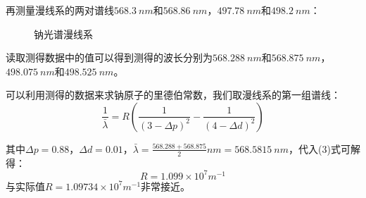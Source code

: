 \documentclass[utf8]{ctexart}
\begin{document}
	再测量漫线系的两对谱线$\qty{568.3}{nm}$和$\qty{568.86}{nm}$，$\qty{497.78}{nm}$和$\qty{498.2}{nm}$：
	\begin{figure}[htbp]
		\centering
		\hspace{0.1in} %
	\caption{钠光谱漫线系}
	\end{figure}

	读取测得数据中的值可以得到测得的波长分别为$\qty{568.288}{nm}$和$\qty{568.875}{nm}$，$\qty{498.075}{nm}$和$\qty{498.525}{nm}$。
	
	可以利用测得的数据来求钠原子的里德伯常数，我们取漫线系的第一组谱线：
	\begin{equation}
		\frac{1}{\bar{\lambda}} = R\left(\frac{1}{(3-\Delta{p})^2} - \frac{1}{(4 - \Delta{d})^2}\right)
	\end{equation}
	
	其中$\Delta{p} = 0.88$，$\Delta{d} = 0.01$，$\bar{\lambda} = \frac{568.288+568.875}{2} \unit{nm}= \qty{568.5815}{nm}$，代入(3)式可解得：
	\begin{equation}
		R = 1.099 \times 10^7 \unit{m^{-1}}
	\end{equation}
	与实际值$R = 1.09734 \times 10^7 \unit{m^{-1}}$非常接近。
\end{document}
